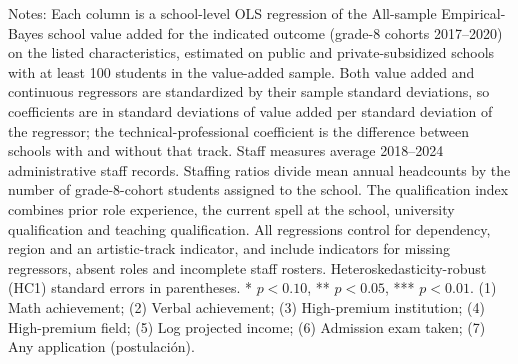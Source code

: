 \begin{table}[!htbp]
\begin{minipage}{\textwidth}
Notes: Each column is a school-level OLS regression of the All-sample Empirical-Bayes school value added for the indicated outcome (grade-8 cohorts 2017--2020) on the listed characteristics, estimated on public and private-subsidized schools with at least 100 students in the value-added sample. Both value added and continuous regressors are standardized by their sample standard deviations, so coefficients are in standard deviations of value added per standard deviation of the regressor; the technical-professional coefficient is the difference between schools with and without that track. Staff measures average 2018--2024 administrative staff records. Staffing ratios divide mean annual headcounts by the number of grade-8-cohort students assigned to the school. The qualification index combines prior role experience, the current spell at the school, university qualification and teaching qualification. All regressions control for dependency, region and an artistic-track indicator, and include indicators for missing regressors, absent roles and incomplete staff rosters. Heteroskedasticity-robust (HC1) standard errors in parentheses. * $p<0.10$, ** $p<0.05$, *** $p<0.01$. (1) Math achievement; (2) Verbal achievement; (3) High-premium institution; (4) High-premium field; (5) Log projected income; (6) Admission exam taken; (7) Any application (postulaci\'on).
\end{minipage}
\end{table}
